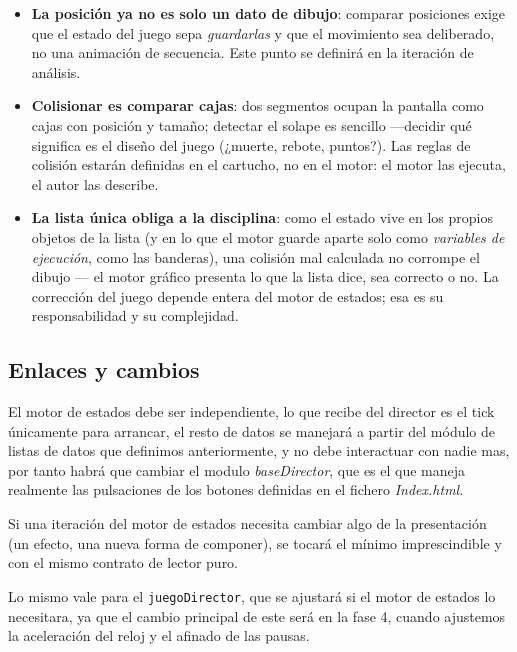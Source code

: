 \begin{itemize}
	\item \textbf{La posición ya no es solo un dato de dibujo}: comparar posiciones exige
	que el estado del juego sepa \emph{guardarlas} y que el movimiento sea deliberado, no
	una animación de secuencia. Este punto se definirá en la iteración de análisis.
	
	\item \textbf{Colisionar es comparar cajas}: dos segmentos ocupan la pantalla como
	cajas con posición y tamaño; detectar el solape es sencillo ---decidir qué significa
	es el diseño del juego (¿muerte, rebote, puntos?). Las reglas de colisión estarán definidas en el cartucho, no en el motor: el motor las ejecuta, el autor las describe.
	
	\item \textbf{La lista única obliga a la disciplina}: como el estado vive en los
	propios objetos de la lista (y en lo que el motor guarde aparte solo como
	\emph{variables de ejecución}, como las banderas), una colisión mal calculada no
	corrompe el dibujo --- el motor gráfico presenta lo que la lista dice, sea correcto o
	no. La corrección del juego depende entera del motor de estados; esa es su
	responsabilidad y su complejidad.
\end{itemize}

\subsection{Enlaces y cambios}
\label{subsec:AlcanceFaseTres}

El motor de estados debe ser independiente, lo que recibe del director es el tick únicamente para arrancar, el resto de datos se manejará a partir del módulo de listas de datos que definimos anteriormente, y no debe interactuar con nadie mas, por tanto habrá que cambiar el modulo \emph{baseDirector}, que es el que maneja realmente las pulsaciones de los botones definidas en el fichero \emph{Index.html}.

Si una iteración del motor de estados necesita cambiar algo de la presentación (un efecto, una nueva forma de componer), se tocará el mínimo imprescindible y con el mismo contrato de lector puro.

Lo mismo vale para el \texttt{juegoDirector}, que se ajustará si el motor de estados lo necesitara, ya que el cambio principal de este será en la fase 4, cuando ajustemos la aceleración del reloj y el afinado de las pausas.

\clearpage